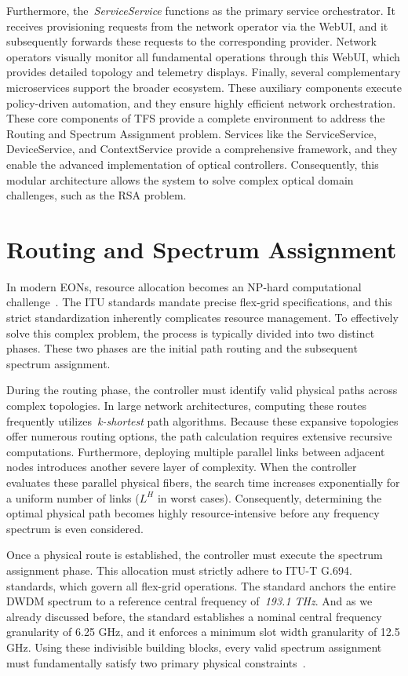 \documentclass[12pt, a4paper, twoside, openright]{report}
\begin{document}
Furthermore, the~\emph{ServiceService} functions as the primary service orchestrator. It receives provisioning requests from the network operator via the WebUI, and it subsequently forwards these requests to the corresponding provider. Network operators visually monitor all fundamental operations through this WebUI, which provides detailed topology and telemetry displays. Finally, several complementary microservices support the broader ecosystem. These auxiliary components execute policy-driven automation, and they ensure highly efficient network orchestration. These core components of TFS provide a complete environment to address the Routing and Spectrum Assignment problem. Services like the ServiceService, DeviceService, and ContextService provide a comprehensive framework, and they enable the advanced implementation of optical controllers. Consequently, this modular architecture allows the system to solve complex optical domain challenges, such as the RSA problem.
\section{Routing and Spectrum Assignment}
In modern EONs, resource allocation becomes an NP-hard computational challenge~\cite{rsaHeuristicSliced}. The ITU standards mandate precise flex-grid specifications, and this strict standardization inherently complicates resource management. To effectively solve this complex problem, the process is typically divided into two distinct phases. These two phases are the initial path routing and the subsequent spectrum assignment.

During the routing phase, the controller must identify valid physical paths across complex topologies. In large network architectures, computing these routes frequently utilizes~\emph{k-shortest} path algorithms. Because these expansive topologies offer numerous routing options, the path calculation requires extensive recursive computations. Furthermore, deploying multiple parallel links between adjacent nodes introduces another severe layer of complexity. When the controller evaluates these parallel physical fibers, the search time increases exponentially for a uniform number of links ($L^H$ in worst cases). Consequently, determining the optimal physical path becomes highly resource-intensive before any frequency spectrum is even considered.

Once a physical route is established, the controller must execute the spectrum assignment phase. This allocation must strictly adhere to ITU-T G.694.~\cite{itu694} standards, which govern all flex-grid operations. The standard anchors the entire DWDM spectrum to a reference central frequency of~\emph{193.1 THz}. And as we already discussed before, the standard establishes a nominal central frequency granularity of 6.25 GHz, and it enforces a minimum slot width granularity of 12.5 GHz. Using these indivisible building blocks, every valid spectrum assignment must fundamentally satisfy two primary physical constraints~\cite{algorithmsRSATaxonomy}.
\end{document}
